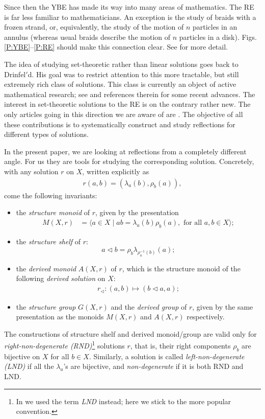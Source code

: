 \documentclass{amsart}
\newcommand\op{\mathrel{\triangleleft}}
\theoremstyle{plain}
\theoremstyle{definition}
\theoremstyle{remark}
\begin{document}
Since then the YBE has made its way into many areas of mathematics. The RE is far less familiar to mathematicians. An exception is the study of braids with a frozen strand, or, equivalently, the study of the motion of $n$ particles in an annulus (whereas usual braids describe the motion of $n$ particles in a disk). Figs. \ref{P:YBE}--\ref{P:RE} should make this connection clear. See \cite{Chow,Sossinsky,Schwiebert} for more detail.

The idea of studying set-theoretic rather than linear solutions goes back to Drinfel$'$d. His goal was to restrict attention to this more tractable, but still extremely rich class of solutions. This class is currently an object of active mathematical research; see \cite{SS18,GI18,JKVA19,MBBER19,Rump20,CCS20,CJO20} and references therein for some recent advances. The interest in set-theoretic solutions to the RE is on the contrary rather new. The only articles going in this direction we are aware of are  \cite{DC18,KuOka,SVW18,K19,DoiSmo}. The objective of all these contributions is to systematically construct and study reflections for different types of solutions. 

In the present paper, we are looking at reflections from a completely different angle. For us they are tools for studying the corresponding solution. Concretely, with any solution $r$ on $X$, written explicitly as
\begin{align}
r(a,b) = (\lambda_a(b),\rho_b(a)),\label{E:r_explicit}
\end{align}
 come the following invariants:
\begin{itemize}
\item the \emph{structure monoid} of $r$, given by the presentation
\begin{align}
M(X,r) &= \langle a\in X\mid ab=\lambda_a(b) \rho_b(a), \text{ for all } a,b\in X \rangle;\label{E:StrMonoid}
\end{align}
\item the \emph{structure shelf} of $r$:
\[a \op b = \rho_b \lambda_{\rho_a^{-1}(b)}(a);\]
\item the \emph{derived monoid} $A(X,r)$ of $r$, which is the structure monoid of the following \emph{derived solution} on $X$:
\begin{align}
r_{\op} \colon (a,b) \mapsto (b \op a,a);\label{E:DerSol}
\end{align}
\item the \emph{structure group} $G(X,r)$ and the \emph{derived group} of $r$, given by the same presentation as the monoids $M(X,r)$ and $A(X,r)$ respectively. 
\end{itemize}
The constructions of structure shelf and derived monoid/group are valid only for \emph{right-non-degenerate (RND)}\footnote{In \cite{LebVen} we used the term \emph{LND} instead; here we stick to the more popular convention.} solutions $r$, that is, their right components $\rho_b$ are bijective on $X$ for all $b \in X$. Similarly, a solution is called \emph{left-non-degenerate (LND)} if all the $\lambda_a$'s are bijective, and \emph{non-degenerate} if it is both RND and LND.
\end{document}
